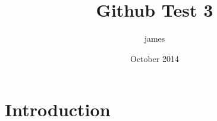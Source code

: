\documentclass{article}
\title{Github Test 3}
\author{james }
\date{October 2014}
\begin{document}
\maketitle

\section{Introduction}
\end{document}
